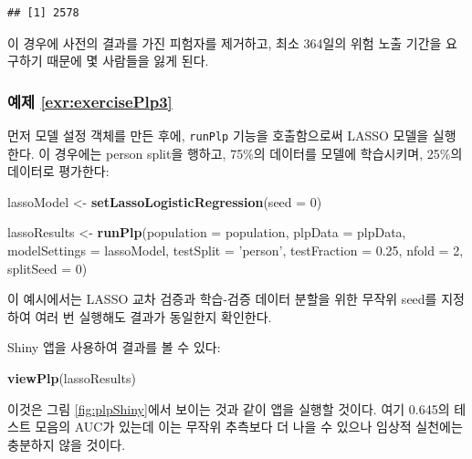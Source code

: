 \documentclass[10.5pt]{book}
\newenvironment{Shaded}{\begin{snugshade}}{\end{snugshade}}
\newcommand{\KeywordTok}[1]{\textcolor[rgb]{0.13,0.29,0.53}{\textbf{#1}}}
\newcommand{\DataTypeTok}[1]{\textcolor[rgb]{0.13,0.29,0.53}{#1}}
\newcommand{\DecValTok}[1]{\textcolor[rgb]{0.00,0.00,0.81}{#1}}
\newcommand{\FloatTok}[1]{\textcolor[rgb]{0.00,0.00,0.81}{#1}}
\newcommand{\StringTok}[1]{\textcolor[rgb]{0.31,0.60,0.02}{#1}}
\newcommand{\NormalTok}[1]{#1}
\theoremstyle{definition}
\theoremstyle{definition}
\theoremstyle{definition}
\theoremstyle{remark}
\begin{document}
\begin{verbatim}
## [1] 2578
\end{verbatim}

이 경우에 사전의 결과를 가진 피험자를 제거하고, 최소 364일의 위험 노출
기간을 요구하기 때문에 몇 사람들을 잃게 된다.

\subsubsection*{예제 \ref{exr:exercisePlp3}}\label{-refexrexerciseplp3}

먼저 모델 설정 객체를 만든 후에, \texttt{runPlp} 기능을 호출함으로써
LASSO 모델을 실행한다. 이 경우에는 person split을 행하고, 75\%의
데이터를 모델에 학습시키며, 25\%의 데이터로 평가한다:

\begin{Shaded}
\begin{Highlighting}[]
\NormalTok{lassoModel <-}\StringTok{ }\KeywordTok{setLassoLogisticRegression}\NormalTok{(}\DataTypeTok{seed =} \DecValTok{0}\NormalTok{)}

\NormalTok{lassoResults <-}\StringTok{ }\KeywordTok{runPlp}\NormalTok{(}\DataTypeTok{population =}\NormalTok{ population, }
                       \DataTypeTok{plpData =}\NormalTok{ plpData, }
                       \DataTypeTok{modelSettings =}\NormalTok{ lassoModel, }
                       \DataTypeTok{testSplit =} \StringTok{'person'}\NormalTok{,}
                       \DataTypeTok{testFraction =} \FloatTok{0.25}\NormalTok{, }
                       \DataTypeTok{nfold =} \DecValTok{2}\NormalTok{, }
                       \DataTypeTok{splitSeed =} \DecValTok{0}\NormalTok{)}
\end{Highlighting}
\end{Shaded}

이 예시에서는 LASSO 교차 검증과 학습-검증 데이터 분할을 위한 무작위
seed를 지정하여 여러 번 실행해도 결과가 동일한지 확인한다.

Shiny 앱을 사용하여 결과를 볼 수 있다:

\begin{Shaded}
\begin{Highlighting}[]
\KeywordTok{viewPlp}\NormalTok{(lassoResults)}
\end{Highlighting}
\end{Shaded}

이것은 그림 \ref{fig:plpShiny}에서 보이는 것과 같이 앱을 실행할 것이다.
여기 0.645의 테스트 모음의 AUC가 있는데 이는 무작위 추측보다 더 나을 수
있으나 임상적 실천에는 충분하지 않을 것이다.
\end{document}
